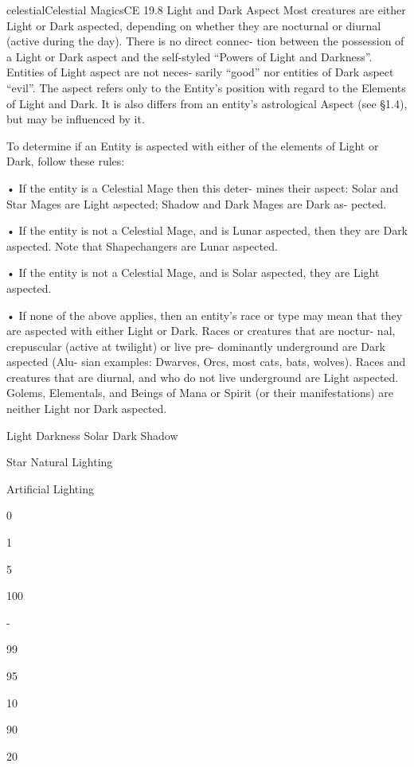 \begin{College}[1.3]{celestial}{Celestial Magics}{CE}
19.8 Light and Dark Aspect 
Most  creatures  are  either  Light  or  Dark  aspected, 
depending on whether they are nocturnal or diurnal 
(active during the day). There is no direct connec-
tion  between  the  possession  of  a  Light  or  Dark 
aspect  and  the  self-styled  “Powers  of  Light  and 
Darkness”.  Entities  of  Light  aspect  are  not  neces-
sarily  “good”  nor  entities  of  Dark  aspect  “evil”. 
The aspect refers only to the Entity’s position with 
regard to the Elements of Light and Dark. It is also 
differs  from  an  entity’s  astrological  Aspect  (see 
§1.4), but may be influenced by it. 

To determine if an Entity is aspected with either of 
the elements of Light or Dark, follow these rules:  

•  If  the  entity  is  a  Celestial  Mage  then  this  deter-
mines their aspect: Solar and Star Mages are Light 
aspected;  Shadow  and  Dark  Mages  are  Dark  as-
pected.  

• If the entity is not a Celestial Mage, and is Lunar 
aspected,  then  they  are  Dark  aspected.  Note  that 
Shapechangers are Lunar aspected.  

• If the entity is not a Celestial Mage, and is Solar 
aspected, they are Light aspected.  

• If none of the above applies, then an entity’s race 
or type may mean that they are aspected with either 
Light  or  Dark.  Races  or  creatures  that  are  noctur-
nal,  crepuscular  (active  at  twilight)  or  live  pre-
dominantly  underground  are  Dark  aspected  (Alu-
sian  examples:  Dwarves,  Orcs,  most  cats,  bats, 
wolves).  Races  and  creatures  that  are  diurnal,  and 
who  do  not  live  underground  are  Light  aspected. 
Golems, Elementals, and Beings of Mana or Spirit 
(or their manifestations) are neither Light nor Dark 
aspected. 

Light  Darkness  Solar  Dark  Shadow 

Star  Natural Lighting 

Artificial Lighting 

0%

1%

5%

100%

- 

99%

95%

10%

90%

20%


\end{College}
